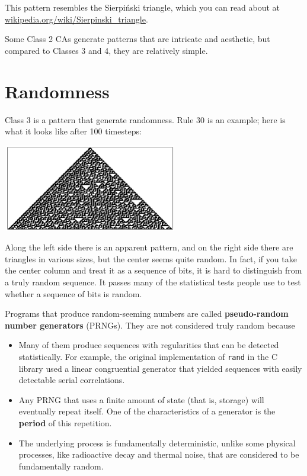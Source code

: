\documentclass[10pt]{book}
\begin{document}
This pattern resembles the Sierpi\'{n}ski triangle, which 
you can read about at \url{wikipedia.org/wiki/Sierpinski_triangle}.

Some Class 2 CAs generate patterns that are intricate and
aesthetic, but compared to Classes 3 and 4, they are relatively
simple.


\section{Randomness}

Class 3 is a pattern that generate randomness.
Rule 30 is an example; here is what it looks like
after 100 timesteps:

\beforefig
\centerline{\includegraphics[width=3.0in,height=1.5in]{figs/rule30.eps}}
\afterfig

Along the left side there is an apparent pattern, and on the right
side there are triangles in various sizes, but the center seems
quite random.  In fact, if you take the center column and treat it as a
sequence of bits, it is hard to distinguish from a truly random
sequence.  It passes many of the statistical tests people use
to test whether a sequence of bits is random.  

Programs that produce random-seeming numbers are called
{\bf pseudo-random number generators} (PRNGs).  They are not considered
truly random because

\begin{itemize}

\item Many of them produce sequences with regularities that
can be detected statistically.  For example, the original implementation
of {\tt rand} in the C library used a linear congruential generator
that yielded sequences with easily detectable serial correlations.

\item Any PRNG that uses a finite amount
of state (that is, storage) will eventually repeat itself.  One of the
characteristics of a generator is the {\bf period} of this
repetition.

\item The underlying process is fundamentally deterministic,
unlike some physical processes, like radioactive decay and
thermal noise, that are considered to be fundamentally
random.

\end{itemize}
\end{document}
